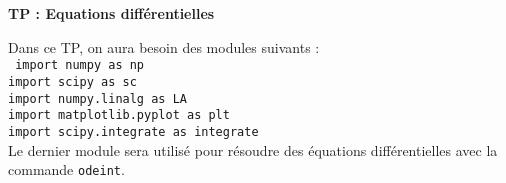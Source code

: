 \documentclass[12pt]{article}
\begin{document}
\setcounter{page}{1}\noindent 
\univ\hfill
\annee \\
\cours\hfill \\
\coursbis \hfill
\par\bigskip

\par\bigskip
\begin{center}
\Large{ \bf TP : Equations diff\'erentielles}
\end{center}

Dans ce TP, on aura besoin des modules suivants : \\ 
\texttt{
import numpy as np \\
import scipy as sc\\
import numpy.linalg as LA\\
import matplotlib.pyplot as plt \\
import scipy.integrate as integrate \vspace{0.3cm}\\
}
Le dernier module sera utilis\'e pour r\'esoudre des \'equations diff\'erentielles avec la commande \texttt{odeint}. 
\end{document}

